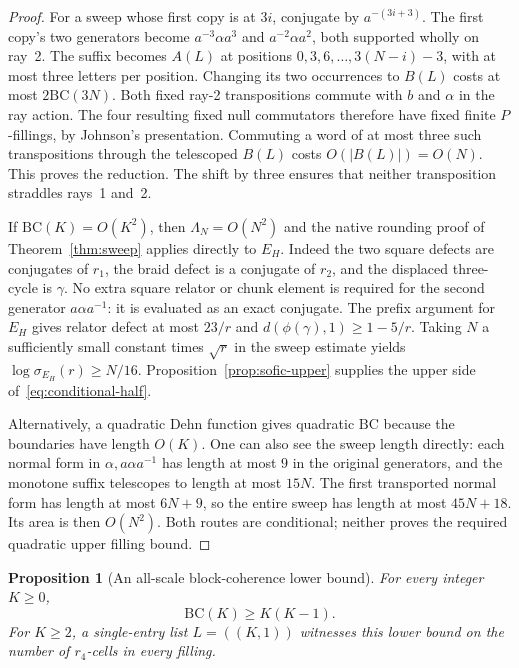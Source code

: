 \documentclass[11pt,a4paper]{article}
\theoremstyle{plain}
\newtheorem{proposition}[theorem]{Proposition}
\theoremstyle{definition}
\theoremstyle{remark}
\begin{document}
\begin{proof}
For a sweep whose first copy is at $3i$, conjugate by $a^{-(3i+3)}$.
The first copy's two generators become $a^{-3}\alpha a^3$ and $a^{-2}\alpha a^2$, both supported wholly on ray~2.
The suffix becomes $A(L)$ at positions $0,3,6,\ldots,3(N-i)-3$, with at most three letters per position.
Changing its two occurrences to $B(L)$ costs at most $2\mathrm{BC}(3N)$.
Both fixed ray-2 transpositions commute with $b$ and $\alpha$ in the ray action.
The four resulting fixed null commutators therefore have fixed finite $P$-fillings, by Johnson's presentation.
Commuting a word of at most three such transpositions through the telescoped $B(L)$ costs $O(|B(L)|)=O(N)$.
This proves the reduction. The shift by three ensures that neither transposition straddles rays~1 and~2.

If $\mathrm{BC}(K)=O(K^2)$, then $\Lambda_N=O(N^2)$ and the native rounding proof of Theorem~\ref{thm:sweep} applies directly to $E_H$.
Indeed the two square defects are conjugates of $r_1$, the braid defect is a conjugate of $r_2$, and the displaced three-cycle is $\gamma$.
No extra square relator or chunk element is required for the second generator $a\alpha a^{-1}$: it is evaluated as an exact conjugate.
The prefix argument for $E_H$ gives relator defect at most $23/r$ and $d(\phi(\gamma),1)\ge1-5/r$.
Taking $N$ a sufficiently small constant times $\sqrt r$ in the sweep estimate yields $\log\sigma_{E_H}(r)\ge N/16$.
Proposition~\ref{prop:sofic-upper} supplies the upper side of~\eqref{eq:conditional-half}.

Alternatively, a quadratic Dehn function gives quadratic $\mathrm{BC}$ because the boundaries have length $O(K)$.
One can also see the sweep length directly: each normal form in $\alpha,a\alpha a^{-1}$ has length at most $9$ in the original generators,
and the monotone suffix telescopes to length at most $15N$.
The first transported normal form has length at most $6N+9$, so the entire sweep has length at most $45N+18$.
Its area is then $O(N^2)$. Both routes are conditional; neither proves the required quadratic upper filling bound.
\end{proof}

\begin{proposition}[An all-scale block-coherence lower bound]\label{prop:bc-lower}
For every integer $K\ge0$,
\[
 \mathrm{BC}(K)\ge K(K-1).
\]
For $K\ge2$, a single-entry list $L=((K,1))$ witnesses this lower bound on the number of $r_4$-cells in every filling.
\end{proposition}
\end{document}
